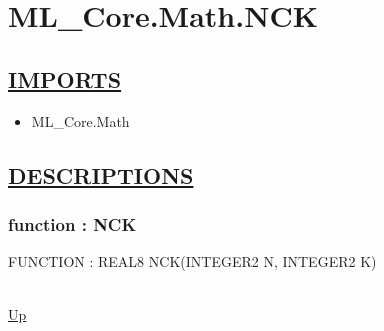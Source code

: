 \chapter*{ML\_Core.Math.NCK}
\hypertarget{ML_Core.Math.NCK}{}

\section*{\underline{IMPORTS}}
\begin{itemize}
\item ML\_Core.Math
\end{itemize}

\section*{\underline{DESCRIPTIONS}}
\subsection*{function : NCK}
\hypertarget{ecldoc:ml_core.math.nck}{FUNCTION : REAL8 NCK(INTEGER2 N, INTEGER2 K)} \\
\hyperlink{ecldoc:}{Up} \\
\par

